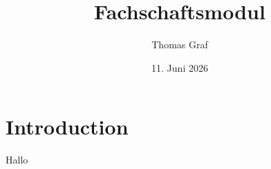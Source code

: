 \documentclass{article}
\title{Fachschaftsmodul}
\author{Thomas Graf}
\date{11. Juni 2026}
\begin{document}
\maketitle

\section{Introduction}
Hallo
\end{document}
